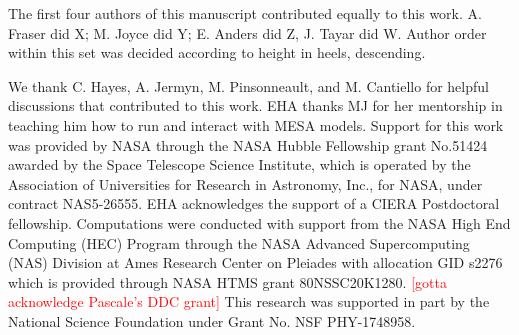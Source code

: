 \documentclass[linenumbers,twocolumn]{aastex62}
\begin{document}
\begin{comment}
\begin{figure}[!htb]
\begin{center}
\texttt{[image: ./Figs/protversusloggmodelpmmPYboth.eps]}%
\caption{The measured core rotation rates for the stars in our sample as a function of gravity compared to the predictions of our solid body model (blue) and our model with a moderately differentially convection zone (pink), showing that these models provide limits on the allowable amount of radial differential rotation in the surface convection zone.}
\label{Fig:bothmodels}
\end{center}
\end{figure}
\end{comment}

\begin{acknowledgements}
The first four authors of this manuscript contributed equally to this work. A. Fraser did X; M. Joyce did Y; E. Anders did Z, J. Tayar did W. Author order within this set was decided according to height in heels, descending.   

We thank C. Hayes, A. Jermyn, M. Pinsonneault, and M. Cantiello for helpful discussions that contributed to this work. 
EHA thanks MJ for her mentorship in teaching him how to run and interact with MESA models.
 Support for this work was provided by NASA through the NASA Hubble Fellowship grant No.51424 awarded by the Space Telescope Science Institute, which is operated by the Association of Universities for Research in Astronomy, Inc., for NASA, under contract NAS5-26555.
 EHA acknowledges the support of a CIERA Postdoctoral fellowship.
 Computations were conducted with support from the NASA High End Computing (HEC) Program through the NASA Advanced Supercomputing (NAS) Division at Ames Research Center on Pleiades with allocation GID s2276 which is provided through NASA HTMS grant 80NSSC20K1280. \textcolor{red}{[gotta acknowledge Pascale's DDC grant]}
This research was supported in part by the National Science Foundation under Grant No. NSF PHY-1748958.


\end{acknowledgements}
\end{document}
